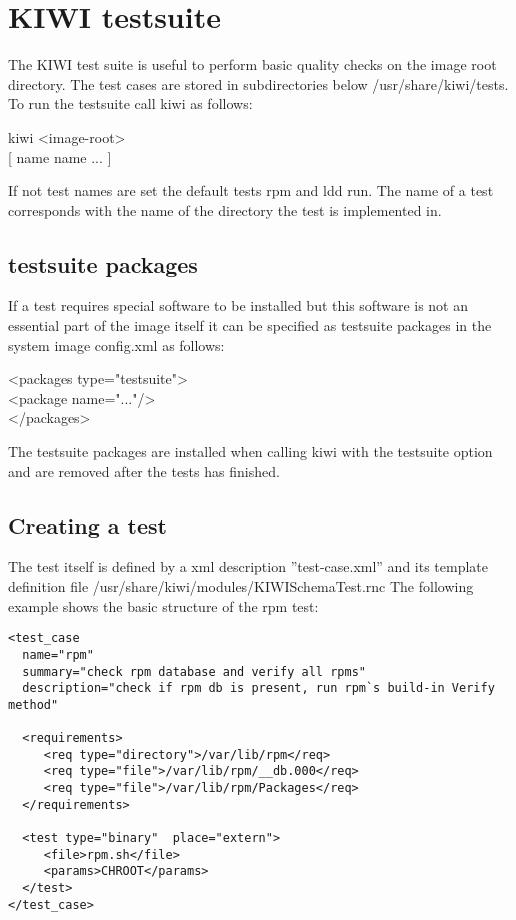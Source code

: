 \chapter{KIWI testsuite}
\label{chapter:testing}
\minitoc

The KIWI test suite is useful to perform basic quality checks on
the image root directory. The test cases are stored in subdirectories
below /usr/share/kiwi/tests. To run the testsuite call kiwi as
follows:

\begin{Command}{12cm}
 kiwi  <image-root> \bs \\
\hspace*{1cm}[  name  name ... ]
\end{Command}

If not test names are set the default tests rpm and ldd run.
The name of a test corresponds with the name of the directory
the test is implemented in.

\section{testsuite packages}
If a test requires special software to be installed but this
software is not an essential part of the image itself it can be
specified as testsuite packages in the system image config.xml
as follows:

\begin{Command}{12cm}
<packages type="testsuite">\\
\hspace*{1cm}<package name="..."/>\\
</packages>
\end{Command}

The testsuite packages are installed when calling kiwi with
the testsuite option and are removed after the tests has
finished.

\section{Creating a test}
The test itself is defined by a xml description ''test-case.xml''
and its template definition file /usr/share/kiwi/modules/KIWISchemaTest.rnc
The following example shows the basic structure of the rpm test:

\begin{verbatim}
<test_case 
  name="rpm"
  summary="check rpm database and verify all rpms"
  description="check if rpm db is present, run rpm`s build-in Verify method"

  <requirements>
     <req type="directory">/var/lib/rpm</req>
     <req type="file">/var/lib/rpm/__db.000</req>
     <req type="file">/var/lib/rpm/Packages</req>
  </requirements>

  <test type="binary"  place="extern">
     <file>rpm.sh</file>
     <params>CHROOT</params>
  </test>
</test_case>
\end{verbatim}

